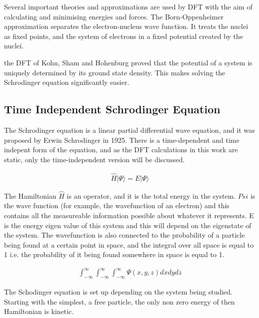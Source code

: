 Several important theories and approximations are used by DFT with the aim of calculating and minimising energies and forces.  The Born-Oppenheimer approximation separates the electron-nucleus wave function.  It treats the nuclei as fixed points, and the system of electrons in a fixed potential created by the nuclei.

 the DFT of Kohn, Sham and Hohenburg proved that the potential of a system is uniquely determined by its ground state density.  This makes solving the Schrodinger equation significantly easier.




\subsection{Time Independent Schrodinger Equation}

The Schrodinger equation is a linear partial differential wave equation, and it was proposed by Erwin Schrodinger in 1925.  There is a time-dependent and time indepent form of the equation, and as the DFT calculations in this work are static, only the time-independent version will be discussed.  

\begin{equation}
\begin{split}
\hat{H} \lvert \Psi \rangle = E \lvert \Psi \rangle
\end{split}
\label{eq:eqTimeIndependentSchrodinger}
\end{equation}

The Hamiltonian $\hat{H}$ is an operator, and it is the total energy in the system.  $Psi$ is the wave function (for example, the wavefunction of an electron) and this contains all the measureable information possible about whatever it represents.  E is the energy eigen value of this system and this will depend on the eigenstate of the system.  The wavefunction is also connected to the probability of a particle being found at a certain point in space, and the integral over all space is equal to 1 i.e. the probability of it being found somewhere in space is equal to 1.

\begin{equation}
\begin{split}
\int_{-\infty}^{\infty} \int_{-\infty}^{\infty}  \int_{-\infty}^{\infty}  \Psi(x,y,z) dx dy dz
\end{split}
\end{equation}

The Schodinger equation is set up depending on the system being studied.  Starting with the simplest, a free particle, the only non zero energy of then Hamiltonian is kinetic.


